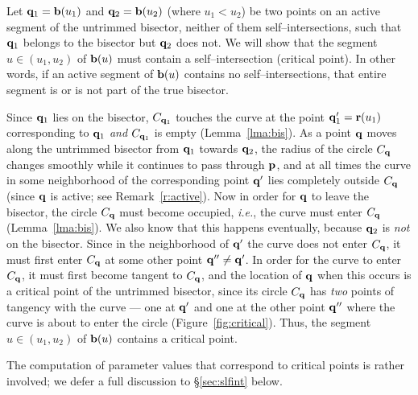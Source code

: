 \prf
Let ${\bf q}_1={\bf b}(u_{1})$ and ${\bf q}_2={\bf b}(u_{2})$ (where
$u_1<u_2$) be two points on an active segment of the untrimmed bisector,
neither of them self--intersections, such that ${\bf q}_1$ belongs to
the bisector but ${\bf q}_2$ does not. We will show that the segment
$u \in (u_1,u_2)$ of ${\bf b}(u)$ must contain a self--intersection
(critical point). In other words, if an active segment of ${\bf b}(u)$
contains no self--intersections, that entire segment is or is not part
of the true bisector.

Since ${\bf q}_1$ lies on the bisector, $C_{{\bf q}_1}$ touches
the curve at the point ${\bf q}'_1={\bf r}(u_{1})$ corresponding to
${\bf q}_1$ {\it and} $C_{{\bf q}_1}$ is empty (Lemma~\ref{lma:bis}).
As a point ${\bf q}$ moves along the untrimmed bisector from ${\bf q}
_1$ towards ${\bf q}_2$, the radius of the circle $C_{\bf q}$ changes
smoothly while it continues to pass through ${\bf p}$, and at all times
the curve in some neighborhood of the corresponding point ${\bf q}'$
lies completely outside $C_{\bf q}$ (since ${\bf q}$ is active; see
Remark~\ref{r:active}). Now in order for ${\bf q}$ to leave the
bisector, the circle $C_{\bf q}$ must become occupied, {\it i.e.},
the curve must enter $C_{\bf q}$ (Lemma~\ref{lma:bis}). We also know
that this happens eventually, because ${\bf q}_2$ is {\it not\/} on
the bisector. Since in the neighborhood of ${\bf q}'$ the curve does
not enter $C_{\bf q}$,
%
%
it must first enter $C_{\bf q}$ at some other point ${\bf q}'' \neq
{\bf q}'$. In order for the curve to enter $C_{\bf q}$, it must first
become tangent to $C_{\bf q}$, and the location of ${\bf q}$ when
this occurs is a critical point of the untrimmed bisector, since its
circle $C_{\bf q}$ has {\it two\/} points of tangency with the curve
--- one at ${\bf q}'$ and one at the other point ${\bf q}''$ where the
curve is about to enter the circle (Figure~\ref{fig:critical}). Thus,
the segment $u \in (u_1,u_2)$ of ${\bf b}(u)$ contains a critical point.
\QED

The computation of parameter values that correspond to critical points is
rather involved; we defer a full discussion to \S\ref{sec:slfint} below.

